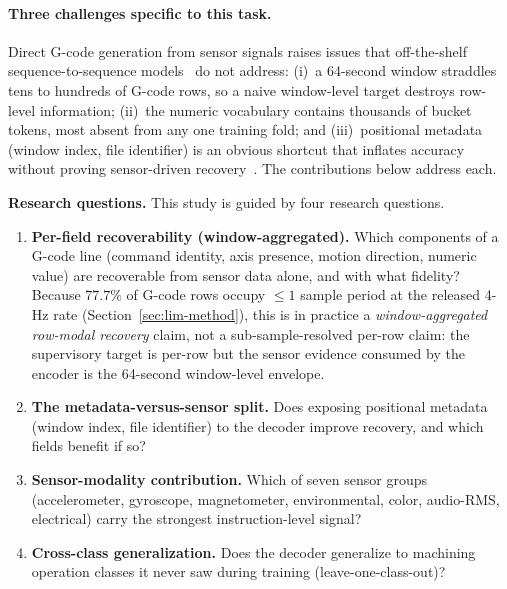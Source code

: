 \documentclass[sensors,article,submit,moreauthors,pdftex]{Definitions/mdpi}
\begin{document}
\paragraph{Three challenges specific to this task.} Direct G-code generation from sensor signals raises issues that off-the-shelf sequence-to-sequence models~\cite{sutskever2014sequence,bahdanau2014neural,vaswani2017attention,graves2013speech} do not address: (i)~a 64-second window straddles tens to hundreds of G-code rows, so a naive window-level target destroys row-level information; (ii)~the numeric vocabulary contains thousands of bucket tokens, most absent from any one training fold; and (iii)~positional metadata (window index, file identifier) is an obvious shortcut that inflates accuracy without proving sensor-driven recovery~\cite{meyes2019ablation,jia2016deep}. The contributions below address each.

\textbf{Research questions.} This study is guided by four research questions.
\begin{enumerate}[label=\textbf{RQ\arabic*.}, leftmargin=*]
\item \textbf{Per-field recoverability (window-aggregated).} Which components of a G-code line (command identity, axis presence, motion direction, numeric value) are recoverable from sensor data alone, and with what fidelity? Because $77.7\%$ of G-code rows occupy $\le\!1$ sample period at the released 4-Hz rate (Section~\ref{sec:lim-method}), this is in practice a \emph{window-aggregated row-modal recovery} claim, not a sub-sample-resolved per-row claim: the supervisory target is per-row but the sensor evidence consumed by the encoder is the 64-second window-level envelope.
\item \textbf{The metadata-versus-sensor split.} Does exposing positional metadata (window index, file identifier) to the decoder improve recovery, and which fields benefit if so?
\item \textbf{Sensor-modality contribution.} Which of seven sensor groups (accelerometer, gyroscope, magnetometer, environmental, color, audio-RMS, electrical) carry the strongest instruction-level signal?
\item \textbf{Cross-class generalization.} Does the decoder generalize to machining operation classes it never saw during training (leave-one-class-out)?
\end{enumerate}
\end{document}
